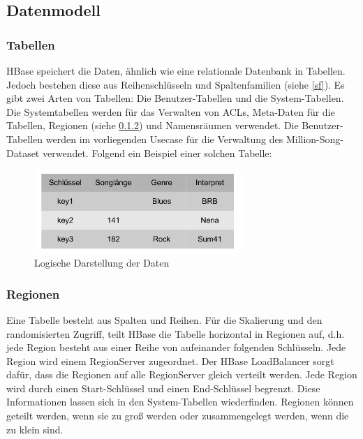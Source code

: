 \subsection{Datenmodell}
\subsubsection{Tabellen}
HBase speichert die Daten, ähnlich wie eine relationale Datenbank in Tabellen. Jedoch bestehen diese aus Reihenschlüsseln und Spaltenfamilien (siehe \ref{sf}). Es gibt zwei Arten von Tabellen: Die Benutzer-Tabellen und die System-Tabellen.
Die Systemtabellen werden für das Verwalten von \acp{ACL}, Meta-Daten für die Tabellen, Regionen (siehe \ref{region}) und Namensräumen verwendet. Die Benutzer-Tabellen werden im vorliegenden Usecase für die Verwaltung des Million-Song-Dataset verwendet. Folgend ein Beispiel einer solchen Tabelle:

\begin{figure}[htbp] 
  \centering
     \includegraphics[width=0.7\textwidth]{images/logisch.pdf}
  \caption{Logische Darstellung der Daten}
  \label{fig:Logische Darstellung der Daten}
\end{figure}



\subsubsection{Regionen}\label{region}
Eine Tabelle besteht aus Spalten und Reihen. Für die Skalierung  und den randomisierten Zugriff, teilt HBase die Tabelle horizontal in Regionen auf, d.h. jede Region besteht aus einer Reihe von aufeinander folgenden Schlüsseln. Jede Region wird einem RegionServer zugeordnet. Der HBase LoadBalancer sorgt dafür, dass die Regionen auf alle RegionServer gleich verteilt werden. Jede Region wird durch einen Start-Schlüssel und einen End-Schlüssel begrenzt. Diese Informationen lassen sich in den System-Tabellen wiederfinden. Regionen können geteilt werden, wenn sie zu groß werden oder zusammengelegt werden, wenn die zu klein sind.

